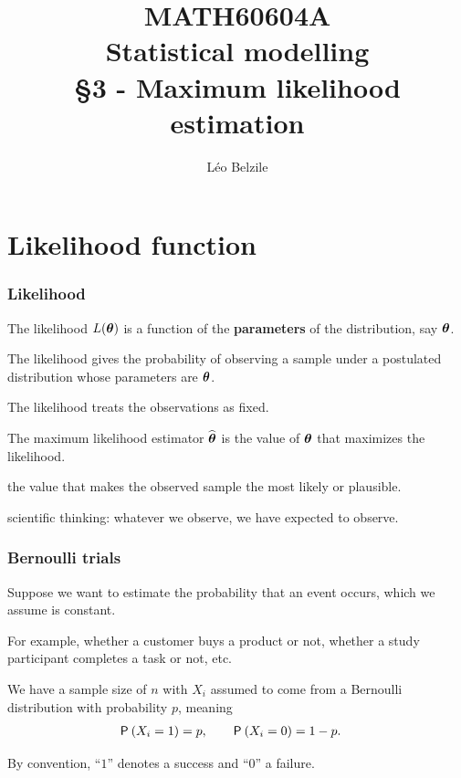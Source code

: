 \documentclass{beamer}
\title[\color{white}{MATH60604A Maximum likelihood estimation}]{\texorpdfstring{MATH60604A \\Statistical modelling \\ \S 3 - Maximum likelihood estimation}{MATH60604A \\Statistical modelling \\ \S~3 - Maximum likelihood estimation}}
\author{Léo Belzile}
\institute{HEC Montréal\\
Department of Decision Sciences}
\date{}
\begin{document}
\frame{\titlepage}
% 
% 
% 
% 
\section{Likelihood function}
\begin{frame}
\frametitle{Likelihood}
\bi

\item The \alert{likelihood} $L(\bs{\theta})$ is a function of the \textbf{parameters} of the distribution, say $\bs{\theta}$.

\bi \item The likelihood  gives the probability of observing a sample under a postulated distribution whose parameters are $\bs{\theta}$.
\item The likelihood treats the observations as fixed.
\ei

\item The \alert{maximum likelihood} estimator $\hat{\bs{\theta}}$ is the value of $\bs{\theta}$ that maximizes the likelihood.
\bi \item the value that makes the observed sample the most \alert{likely} or \alert{plausible}. 
\item scientific thinking: whatever we observe, we have expected to observe.
\ei
\ei
\end{frame}
\begin{frame}
\frametitle{Bernoulli trials}
\bi
\item Suppose we want to estimate the probability that an event occurs, which we assume is constant.
\item For example, whether a customer buys a product or not, whether a study participant completes a task or not, etc.
\item We have a sample size of $n$ with $X_i$ assumed to come from a Bernoulli distribution with probability $p$, meaning 
\begin{align*}
\P{X_i=1}&=p, \qquad \P{X_i=0}=1-p.                                 
\end{align*}

\item By convention, ``$1$'' denotes a success and ``$0$'' a failure.
\ei
\end{frame}
\end{document}
